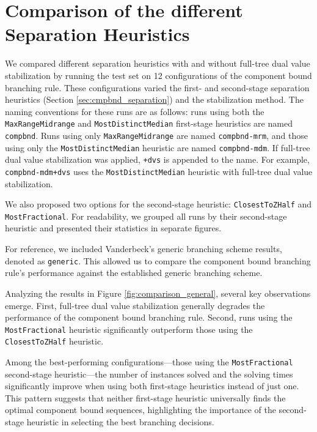 \section{Comparison of the different Separation Heuristics}\label{sec:evaluation_comparison_separation}
We compared different separation heuristics with and without full-tree dual value stabilization by running the test set on 12 configurations of the component bound branching rule. These configurations varied the first- and second-stage separation heuristics (Section \ref{sec:cmpbnd_separation}) and the stabilization method. The naming conventions for these runs are as follows: runs using both the \texttt{MaxRangeMidrange} and \texttt{MostDistinctMedian} first-stage heuristics are named \texttt{compbnd}. Runs using only \texttt{MaxRangeMidrange} are named \texttt{compbnd-mrm}, and those using only the \texttt{MostDistinctMedian} heuristic are named \texttt{compbnd-mdm}. If full-tree dual value stabilization was applied, \texttt{+dvs} is appended to the name. For example, \texttt{compbnd-mdm+dvs} uses the \texttt{MostDistinctMedian} heuristic with full-tree dual value stabilization.

We also proposed two options for the second-stage heuristic: \texttt{ClosestToZHalf} and \texttt{MostFractional}. For readability, we grouped all runs by their second-stage heuristic and presented their statistics in separate figures.

For reference, we included Vanderbeck's generic branching scheme results, denoted as \texttt{generic}. This allowed us to compare the component bound branching rule’s performance against the established generic branching scheme.

Analyzing the results in Figure \ref{fig:comparison_general}, several key observations emerge. First, full-tree dual value stabilization generally degrades the performance of the component bound branching rule. Second, runs using the \texttt{MostFractional} heuristic significantly outperform those using the \texttt{ClosestToZHalf} heuristic.

Among the best-performing configurations—those using the \texttt{MostFractional} second-stage heuristic—the number of instances solved and the solving times significantly improve when using both first-stage heuristics instead of just one. This pattern suggests that neither first-stage heuristic universally finds the optimal component bound sequences, highlighting the importance of the second-stage heuristic in selecting the best branching decisions.

